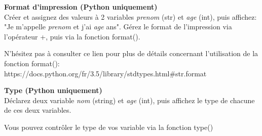 \begin{Exercice}[3 minutes] \textbf{Format d'impression (Python uniquement)}\\
   Créer et assignez des valeurs à 2 variables \textit{prenom} (str) et \textit{age} (int), puis affichez: "Je m'appelle \textit{prenom} et j'ai \textit{age} ans". Gérez le format de l'impression via l'opérateur +, puis via la fonction format(). \\
   
    \begin{conseil}
       N'hésitez pas à consulter ce lien pour plus de détails concernant l'utilisation de la fonction format(): \\
        https://docs.python.org/fr/3.5/library/stdtypes.html\#str.format 
        
    \end{conseil}
    \begin{solution}
     
    
           
    \end{solution}   
\end{Exercice}

\begin{Exercice}[3 minutes] \textbf{Type (Python uniquement)}\\
   Déclarez deux variable \textit{nom} (string) et \textit{age} (int), puis affichez le type de chacune de ces deux variables. \\
   
    \begin{conseil}
       Vous pouvez contrôler le type de vos variable via la fonction type()
        
    \end{conseil}
    \begin{solution}
     
    
           
    \end{solution}   
\end{Exercice}

